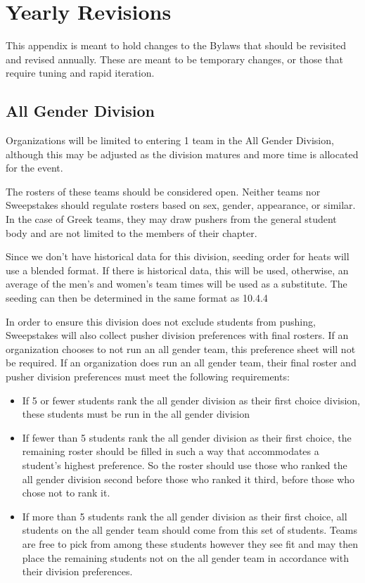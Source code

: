 \section{Yearly Revisions}

This appendix is meant to hold changes to the Bylaws that should be revisited and revised annually. These are meant to be temporary changes, or those that require tuning and rapid iteration. 

\subsection*{All Gender Division} \label{All Gender}

Organizations will be limited to entering 1 team in the All Gender Division, although this may be adjusted as the division matures and more time is allocated for the event. 

The rosters of these teams should be considered open. Neither teams nor Sweepstakes should regulate rosters based on sex, gender, appearance, or similar. In the case of Greek teams, they may draw pushers from the general student body and are not limited to the members of their chapter. 

Since we don't have historical data for this division, seeding order for heats will use a blended format. If there is historical data, this will be used, otherwise, an average of the men's and women's team times will be used as a substitute. The seeding can then be determined in the same format as 10.4.4

In order to ensure this division does not exclude students from pushing, Sweepstakes will also collect pusher division preferences with final rosters. If an organization chooses to not run an all gender team, this preference sheet will not be required. If an organization does run an all gender team, their final roster and pusher division preferences must meet the following requirements: 
\begin{itemize}
    \item If 5 or fewer students rank the all gender division as their first choice division, these students must be run in the all gender division 
    \item If fewer than 5 students rank the all gender division as their first choice, the remaining roster should be filled in such a way that accommodates a student's highest preference. So the roster should use those who ranked the all gender division second before those who ranked it third, before those who chose not to rank it. 
    \item If more than 5 students rank the all gender division as their first choice, all students on the all gender team should come from this set of students. Teams are free to pick from among these students however they see fit and may then place the remaining students not on the all gender team in accordance with their division preferences. 
\end{itemize}


